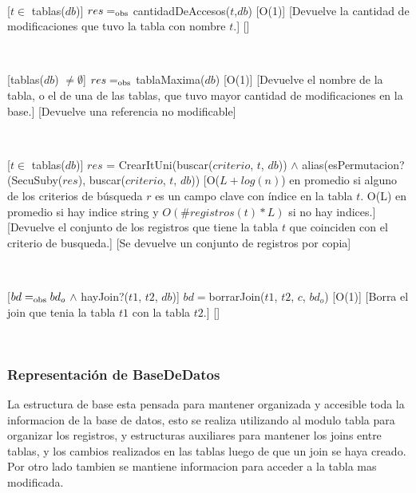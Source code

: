 \begin{Interfaz}
~

[$t \in$ tablas($db$)]
{$res =_{\mathrm{obs}}$ cantidadDeAccesos($t$,$db$)}
[O(1)]
[Devuelve la cantidad de modificaciones que tuvo la tabla con nombre $t$.]
[]

~

[tablas($db$) $\neq \emptyset$]
{$res =_{\mathrm{obs}}$ tablaMaxima($db$)}
[O(1)]
[Devuelve el nombre de la tabla, o el de una de las tablas, que tuvo mayor cantidad de modificaciones en la base.]
[Devuelve una referencia no modificable]

~

[$t \in$ tablas($db$)]
{$res$ = CrearItUni(buscar($criterio$, $t$, $db$)) $\land$ alias(esPermutacion?(SecuSuby($res$), buscar($criterio$, $t$, $db$))}
[O($L+log(n)$) en promedio si alguno de los criterios de búsqueda $r$ es un campo clave con índice en la tabla $t$.
 O(L) en promedio si hay indice string y $O(\#registros(t) * L)$ si no hay indices.]
[Devuelve el conjunto de los registros que tiene la tabla $t$ que coinciden con el criterio de busqueda.]
[Se devuelve un conjunto de registros por copia]

~

[$bd =_{\mathrm{obs}} bd_o$ $\land$ hayJoin?($t1$, $t2$, $db$)]
{$bd = $borrarJoin($t1$, $t2$, $c$, $bd_o$)}
[O(1)]
[Borra el join que tenia la tabla $t1$ con la tabla $t2$.]
[]

\end{Interfaz}

~

\pagebreak
\subsubsection{Representaci\'on de BaseDeDatos}

La estructura de base esta pensada para mantener organizada y accesible toda la informacion de la base de datos, esto se realiza utilizando al modulo tabla para organizar los registros, y estructuras auxiliares para mantener los joins entre tablas, y los cambios realizados en las tablas luego de que un join se haya creado. Por otro lado tambien se mantiene informacion para acceder a la tabla mas modificada.


